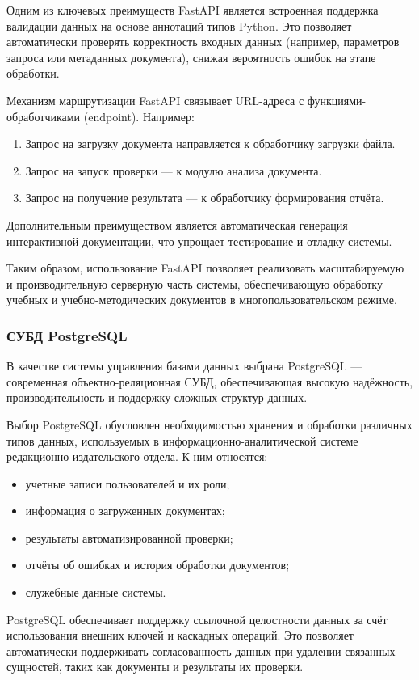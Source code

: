 Одним из ключевых преимуществ FastAPI является встроенная поддержка валидации данных на основе аннотаций типов Python. Это позволяет автоматически проверять корректность входных данных (например, параметров запроса или метаданных документа), снижая вероятность ошибок на этапе обработки.

Механизм маршрутизации FastAPI связывает URL-адреса с функциями-обработчиками (endpoint). Например:
\begin{enumerate}
	\item Запрос на загрузку документа направляется к обработчику загрузки файла.
	\item Запрос на запуск проверки — к модулю анализа документа.
	\item Запрос на получение результата — к обработчику формирования отчёта.
\end{enumerate}

Дополнительным преимуществом является автоматическая генерация интерактивной документации, что упрощает тестирование и отладку системы.

Таким образом, использование FastAPI позволяет реализовать масштабируемую и производительную серверную часть системы, обеспечивающую обработку учебных и учебно-методических документов в многопользовательском режиме.

\subsubsection{СУБД PostgreSQL}

В качестве системы управления базами данных выбрана PostgreSQL — современная объектно-реляционная СУБД, обеспечивающая высокую надёжность, производительность и поддержку сложных структур данных.

Выбор PostgreSQL обусловлен необходимостью хранения и обработки различных типов данных, используемых в информационно-аналитической системе редакционно-издательского отдела. К ним относятся:
\begin{itemize}
	\item учетные записи пользователей и их роли;
	\item информация о загруженных документах;
	\item результаты автоматизированной проверки;
	\item отчёты об ошибках и история обработки документов;
	\item служебные данные системы.
\end{itemize}

PostgreSQL обеспечивает поддержку ссылочной целостности данных за счёт использования внешних ключей и каскадных операций. Это позволяет автоматически поддерживать согласованность данных при удалении связанных сущностей, таких как документы и результаты их проверки.

